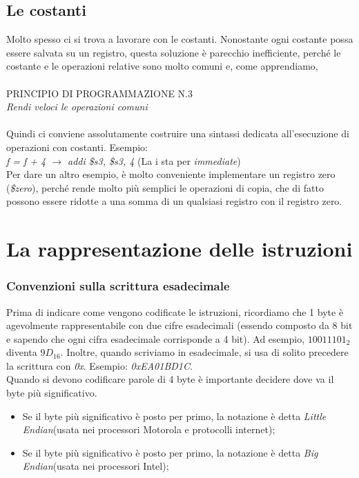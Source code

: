 \documentclass[class=book, crop=false]{standalone}
\begin{document}
\subsection{Le costanti}
Molto spesso ci si trova a lavorare con le costanti. Nonostante ogni costante possa essere salvata su un registro, questa soluzione è parecchio inefficiente, perché le costante e le operazioni relative sono molto comuni e, come apprendiamo,\\\\
PRINCIPIO DI PROGRAMMAZIONE N.3\\\textit{Rendi veloci le operazioni comuni}\\\\
Quindi ci conviene assolutamente costruire una sintassi dedicata all'esecuzione di operazioni con costanti. Esempio:\\
\emph{f = f + 4 $\rightarrow$ addi \$s3, \$s3, 4} (La i sta per \textit{immediate})\\
Per dare un altro esempio, è molto conveniente implementare un registro zero (\emph{\$zero}), perché rende molto più semplici le operazioni di copia, che di fatto possono essere ridotte a una somma di un qualsiasi registro con il registro zero.
\section{La rappresentazione delle istruzioni}
\subsubsection{Convenzioni sulla scrittura esadecimale}
Prima di indicare come vengono codificate le istruzioni, ricordiamo che 1 byte è agevolmente rappresentabile con due cifre esadecimali (essendo composto da 8 bit e sapendo che ogni cifra esadecimale corrisponde a 4 bit). Ad esempio, $1001 1101_{2}$ diventa $9D_{16}$. Inoltre, quando scriviamo in esadecimale, si usa di solito precedere la scrittura con \emph{0x}. Esempio: \textit{0xEA01BD1C}.\\
Quando si devono codificare parole di 4 byte è importante decidere dove va il byte più significativo.
\begin{itemize}
	\item Se il byte più significativo è posto per primo, la notazione è detta \emph{Little Endian}(usata nei processori Motorola e protocolli internet);
	\item Se il byte più significativo è posto per primo, la notazione è detta \emph{Big Endian}(usata nei processori Intel);
\end{itemize}
\end{document}
